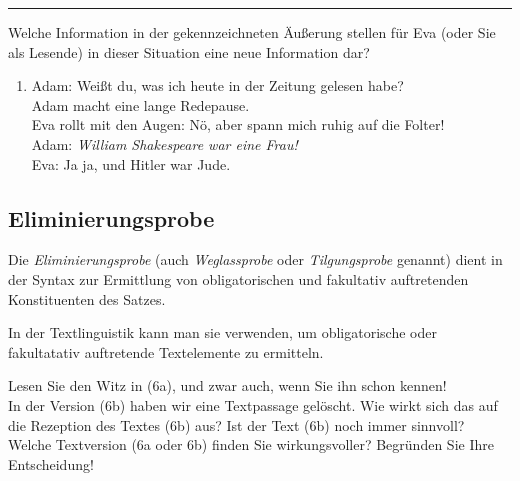 \documentclass[
  letterpaper,
  DIV=11,
  numbers=noendperiod]{scrreprt}
\providecommand{\tightlist}{%
  \setlength{\itemsep}{0pt}\setlength{\parskip}{0pt}}\usepackage{longtable,booktabs,array}
\begin{document}
\begin{center}\rule{0.5\linewidth}{0.5pt}\end{center}

Welche Information in der gekennzeichneten Äußerung stellen für Eva
(oder Sie als Lesende) in dieser Situation eine neue Information dar?\\

\begin{enumerate}
\def\labelenumi{(\arabic{enumi})}
\setcounter{enumi}{4}
\tightlist
\item
  Adam: Weißt du, was ich heute in der Zeitung gelesen habe?\\
  Adam macht eine lange Redepause.\\
  Eva rollt mit den Augen: Nö, aber spann mich ruhig auf die Folter!\\
  Adam: \emph{William Shakespeare war eine Frau!}\\
  Eva: Ja ja, und Hitler war Jude.\\
\end{enumerate}

\hypertarget{eliminierungsprobe}{%
\subsection{Eliminierungsprobe}\label{eliminierungsprobe}}

Die \emph{Eliminierungsprobe} (auch \emph{Weglassprobe} oder
\emph{Tilgungsprobe} genannt) dient in der Syntax zur Ermittlung von
obligatorischen und fakultativ auftretenden Konstituenten des Satzes.

In der Textlinguistik kann man sie verwenden, um obligatorische oder
fakultatativ auftretende Textelemente zu ermitteln.

Lesen Sie den Witz in (6a), und zwar auch, wenn Sie ihn schon kennen!\\
In der Version (6b) haben wir eine Textpassage gelöscht. Wie wirkt sich
das auf die Rezeption des Textes (6b) aus? Ist der Text (6b) noch immer
sinnvoll? Welche Textversion (6a oder 6b) finden Sie wirkungsvoller?
Begründen Sie Ihre Entscheidung!
\end{document}
